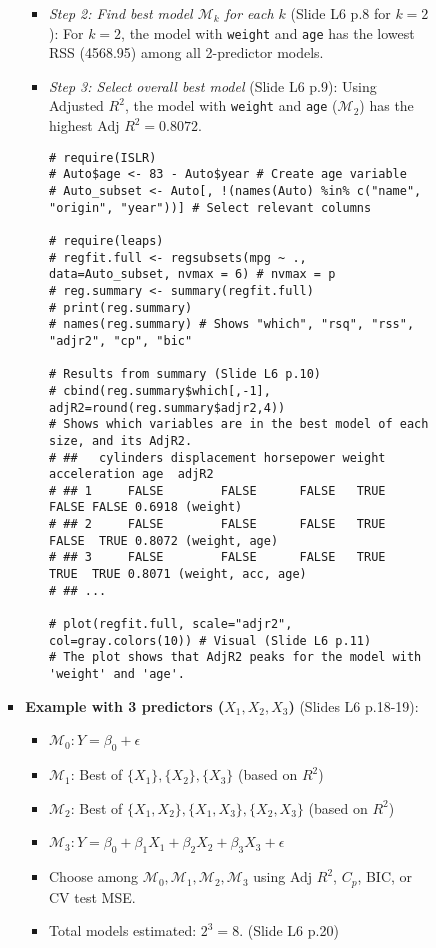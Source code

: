 \documentclass[12pt,a4paper]{article}
\newcommand{\Rcode}[1]{\texttt{#1}} %
\begin{document}
\begin{itemize}
\begin{itemize}
\begin{itemize}
\begin{itemize}
\begin{itemize}
                    \item \textit{Step 2: Find best model $\mathcal{M}_k$ for each $k$} (Slide L6 p.8 for $k=2$):
                        For $k=2$, the model with \Rcode{weight} and \Rcode{age} has the lowest RSS (4568.95) among all 2-predictor models.
                    \item \textit{Step 3: Select overall best model} (Slide L6 p.9): Using Adjusted $R^2$, the model with \Rcode{weight} and \Rcode{age} ($\mathcal{M}_2$) has the highest Adj $R^2 = 0.8072$.
\begin{lstlisting}[caption={Best Subset Selection with leaps::regsubsets (Slides L6 p.10-11)}]
# require(ISLR)
# Auto$age <- 83 - Auto$year # Create age variable
# Auto_subset <- Auto[, !(names(Auto) %in% c("name", "origin", "year"))] # Select relevant columns

# require(leaps)
# regfit.full <- regsubsets(mpg ~ ., data=Auto_subset, nvmax = 6) # nvmax = p
# reg.summary <- summary(regfit.full)
# print(reg.summary)
# names(reg.summary) # Shows "which", "rsq", "rss", "adjr2", "cp", "bic"

# Results from summary (Slide L6 p.10)
# cbind(reg.summary$which[,-1], adjR2=round(reg.summary$adjr2,4))
# Shows which variables are in the best model of each size, and its AdjR2.
# ##   cylinders displacement horsepower weight acceleration age  adjR2
# ## 1     FALSE        FALSE      FALSE   TRUE        FALSE FALSE 0.6918 (weight)
# ## 2     FALSE        FALSE      FALSE   TRUE        FALSE  TRUE 0.8072 (weight, age)
# ## 3     FALSE        FALSE      FALSE   TRUE         TRUE  TRUE 0.8071 (weight, acc, age)
# ## ...

# plot(regfit.full, scale="adjr2", col=gray.colors(10)) # Visual (Slide L6 p.11)
# The plot shows that AdjR2 peaks for the model with 'weight' and 'age'.
\end{lstlisting}
                \end{itemize}
            \item \textbf{Example with 3 predictors ($X_1, X_2, X_3$)} (Slides L6 p.18-19):
                \begin{itemize}
                    \item $\mathcal{M}_0: Y = \beta_0 + \epsilon$
                    \item $\mathcal{M}_1$: Best of $\{X_1\}, \{X_2\}, \{X_3\}$ (based on $R^2$)
                    \item $\mathcal{M}_2$: Best of $\{X_1,X_2\}, \{X_1,X_3\}, \{X_2,X_3\}$ (based on $R^2$)
                    \item $\mathcal{M}_3: Y = \beta_0 + \beta_1 X_1 + \beta_2 X_2 + \beta_3 X_3 + \epsilon$
                    \item Choose among $\mathcal{M}_0, \mathcal{M}_1, \mathcal{M}_2, \mathcal{M}_3$ using Adj $R^2$, $C_p$, BIC, or CV test MSE.
                    \item Total models estimated: $2^3 = 8$. (Slide L6 p.20)
                \end{itemize}
        \end{itemize}


\end{itemize}
\end{itemize}
\end{itemize}
\end{document}
